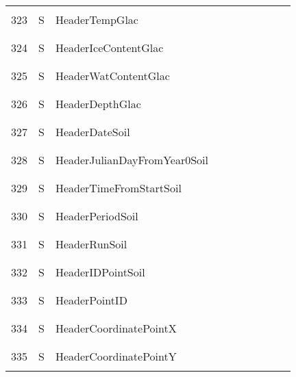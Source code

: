 \begin{longtable}{|c|c|l|c|c|c|c|p{}|c|p{}|}
&&&&&&&&&\\\hline%
&&&&&&&&&\\
323 & S & HeaderTempGlac & & & & & & & \\
&&&&&&&&&\\\hline%
&&&&&&&&&\\
324 & S & HeaderIceContentGlac & & & & & & & \\
&&&&&&&&&\\\hline%
&&&&&&&&&\\
325 & S & HeaderWatContentGlac & & & & & & & \\
&&&&&&&&&\\\hline%
&&&&&&&&&\\
326 & S & HeaderDepthGlac & & & & & & & \\
&&&&&&&&&\\\hline%
&&&&&&&&&\\
327 & S & HeaderDateSoil & & & & & & & \\
&&&&&&&&&\\\hline%
&&&&&&&&&\\
328 & S & HeaderJulianDayFromYear0Soil & & & & & & & \\
&&&&&&&&&\\\hline%
&&&&&&&&&\\
329 & S & HeaderTimeFromStartSoil & & & & & & & \\
&&&&&&&&&\\\hline%
&&&&&&&&&\\
330 & S & HeaderPeriodSoil & & & & & & & \\
&&&&&&&&&\\\hline%
&&&&&&&&&\\
331 & S & HeaderRunSoil & & & & & & & \\
&&&&&&&&&\\\hline%
&&&&&&&&&\\
332 & S & HeaderIDPointSoil & & & & & & & \\
&&&&&&&&&\\\hline%
&&&&&&&&&\\
333 & S & HeaderPointID & & & & & & & \\
&&&&&&&&&\\\hline%
&&&&&&&&&\\
334 & S & HeaderCoordinatePointX & & & & & & & \\
&&&&&&&&&\\\hline%
&&&&&&&&&\\
335 & S & HeaderCoordinatePointY & & & & & & & \\
&&&&&&&&&\\\hline%

\end{longtable}
